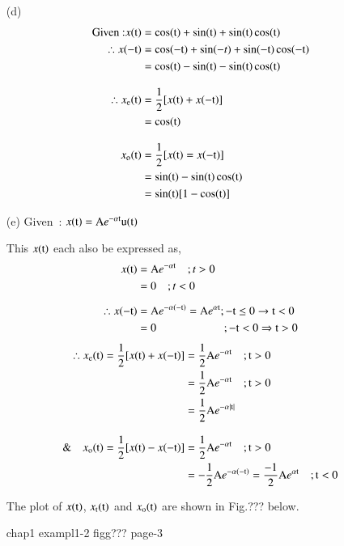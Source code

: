 \begin{solution}
\begin{itemize}
\item[{\rm (d)}]
\begin{align*}
\text{Given~:} x(\textrm{t}) &= \cos(\textrm{t}) + \sin(\textrm{t}) + \sin(\textrm{t}) \cos(\textrm{t})\\
\therefore x(-\textrm{t}) &= \cos(-\textrm{t}) + \sin(-t)+ \sin(-\textrm{t}) \cos(-\textrm{t})\\
 &= \cos(\textrm{t}) -\sin(\textrm{t}) -\sin(\textrm{t}) \cos(\textrm{t})\\[0.3cm]
\therefore x_{\textrm{e}}(\textrm{t}) &= \dfrac{1}{2}[x(\textrm{t}) + x(-\textrm{t})]\\
&= \cos(\textrm{t})\\[0.3cm]
x_{\textrm{o}}(\textrm{t}) &= \dfrac{1}{2}[x(\textrm{t})=x(-\textrm{t})]\\
&= \sin(\textrm{t})-\sin(\textrm{t})\cos(\textrm{t})\\
&=\sin(\textrm{t})[1-\cos(\textrm{t})]
\end{align*}


\item[{\rm (e)}] Given~: \quad $x(\textrm{t}) =\textrm{A} e^{-\alpha \textrm{t}} \textrm{u}(\textrm{t})$

This $x(\textrm{t})$ each also be expressed as,
\begin{align*}
x(\textrm{t}) &= \textrm{A} e^{-\alpha \textrm{t}} \quad;  t > 0\\
        &= 0 \quad ; t < 0\\[0.2cm]
\therefore x(-\textrm{t}) &= \textrm{A} e^{-\alpha(-\textrm{t})} =\textrm{A} e^{\alpha \textrm{t}}; -\textrm{t} \leq 0 \rightarrow  \textrm{t} < 0\\
                    &=0  \qquad\qquad \qquad; -\textrm{t} < 0 \Rightarrow \textrm{t} > 0
\end{align*}
\begin{align*}
\therefore x_{\textrm{e}}(\textrm{t})= \dfrac{1}{2}[x(\textrm{t}) + x(-\textrm{t})] &= \dfrac{1}{2}\textrm{A} e^{-\alpha \textrm{t}} \quad ; \textrm{t} > 0\\
 &= \dfrac{1}{2}\textrm{A} e^{-\alpha \textrm{t}} \quad ; \textrm{t} > 0\\
 &=\dfrac{1}{2}\textrm{A} e^{-\alpha |\textrm{t}|}\\[0.3cm]
 \& \quad x_{\textrm{o}}(\textrm{t})=\dfrac{1}{2}[x(\textrm{t})-x(-\textrm{t})] &= \dfrac{1}{2}\textrm{A} e^{-\alpha \textrm{t}} \quad ; \textrm{t} > 0\\
 &= -\dfrac{1}{2}\textrm{A} e^{-\alpha (-\textrm{t})} = \dfrac{-1}{2} \textrm{A} e^{\alpha \textrm{t}} \quad ; \textrm{t} < 0
\end{align*}

The plot of $x(\textrm{t})$, $x_{\textrm{t}}(\textrm{t})$ and $x_{\textrm{o}}(\textrm{t})$ are shown in Fig.??? below.
\begin{center}
chap1 exampl1-2 figg??? page-3
\end{center}


\end{itemize}
\end{solution}
